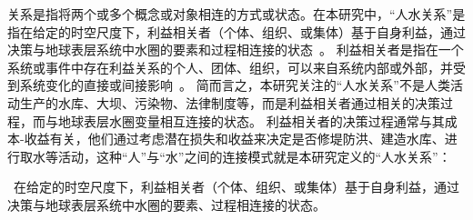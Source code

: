 关系是指将两个或多个概念或对象相连的方式或状态。在本研究中，“人\textendash{}水关系”是指在给定的时空尺度下，利益相关者（个体、组织、或集体）基于自身利益，通过决策与地球表层系统中水圈的要素和过程相连接的状态~\cite{bonnafous-boucher2016}。
利益相关者是指在一个系统或事件中存在利益关系的个人、团体、组织，可以来自系统内部或外部，并受到系统变化的直接或间接影响~\cite{bonnafous-boucher2016}。
简而言之，本研究关注的“人\textendash{}水关系”不是人类活动生产的水库、大坝、污染物、法律制度等，而是利益相关者通过相关的决策过程，而与地球表层水圈变量相互连接的状态。
利益相关者的决策过程通常与其成本-收益有关，他们通过考虑潜在损失和收益来决定是否修堤防洪、建造水库、进行取水等活动，这种“人”与“水”之间的连接模式就是本研究定义的“人\textendash{}水关系”：

{\kai~在给定的时空尺度下，利益相关者（个体、组织、或集体）基于自身利益，通过决策与地球表层系统中水圈的要素、过程相连接的状态。}
